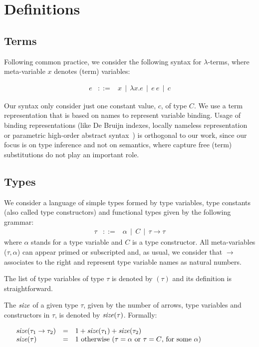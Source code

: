 \section{Definitions}\label{definitions}

\subsection{Terms}\label{terms}

Following common practice, we consider the following syntax for
$\lambda$-terms, where meta-variable $x$ denotes (term) variables:

\[
\begin{array}{rcl}
   e & ::= & x\,\mid\,\lambda x.e\,\mid\,e\:e\,\mid\,c
\end{array}
\]

Our syntax only consider just one constant value, $c$, of type $C$.
We use a term representation that is based on names to represent variable binding.
Usage of binding representations (like De Bruijn indexes, locally nameless
representation or parametric high-order
abstract syntax~\cite{Aydemir08,Chlipala08}) is orthogonal to our work, since
our focus is on type inference and not on semantics, where capture free
(term) substitutions do not play an important role.

\subsection{Types}\label{types}

We consider a language of simple types formed by type variables, type
constants (also called type constructors) and functional types given
by the following grammar:
\[
\begin{array}{rcl}
  \tau & ::= & \alpha\,\mid\,C\,\mid\,\tau\to\tau
\end{array}
\]
where $\alpha$ stands for a type variable and $C$ is a type
constructor. All meta-variables ($\tau,\alpha$) can appear
primed or subscripted and, as usual, we consider that $\to$ associates
to the right and represent type variable names as natural numbers.

The list of type variables of type $\tau$ is denoted by \fv$(\tau)$ and its
definition is straightforward.

The $\text{\it size\/}$ of a given type $\tau$, given by the number of arrows,
type variables and constructors in $\tau$, is denoted by
$\text{\it size\/}(\tau)$. Formally:

\[ \begin{array}[t]{llp{.7\textwidth}}
     \size(\tau_1 \to \tau_2) & = & $1 + \size(\tau_1) + \size(\tau_2)$ \\
     \size(\tau)              & = & $1$ otherwise ($\tau=\alpha$ or $\tau=C$,
                                        for some $\alpha$)
   \end{array}
\]

